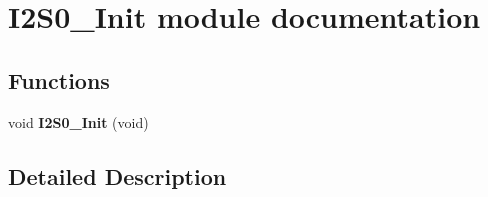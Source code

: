 \hypertarget{group___i2_s0___init__module}{}\section{I2\+S0\+\_\+\+Init module documentation}
\label{group___i2_s0___init__module}
\subsection*{Functions}
\begin{DoxyCompactItemize}
\item 
void {\bfseries I2\+S0\+\_\+\+Init} (void)\hypertarget{group___i2_s0___init__module_ga5a91530fb8ee84cca44c713ec93a6b40}{}\label{group___i2_s0___init__module_ga5a91530fb8ee84cca44c713ec93a6b40}

\end{DoxyCompactItemize}


\subsection{Detailed Description}
